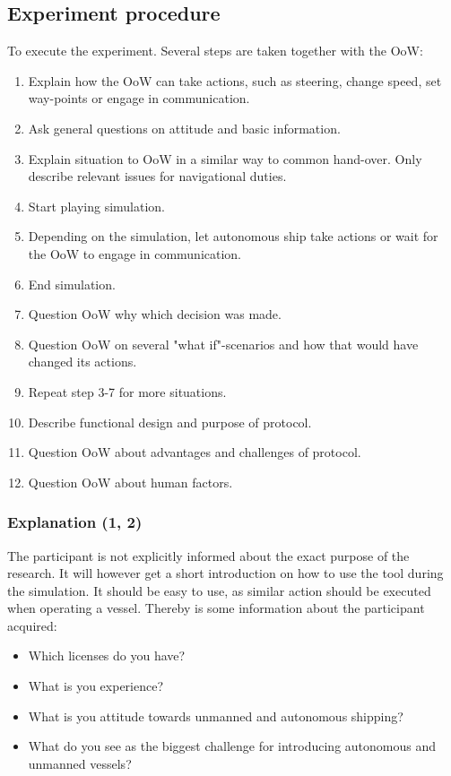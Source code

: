 \subsection{Experiment procedure}
To execute the experiment. Several steps are taken together with the \acf{OoW}:
\begin{enumerate}
	\item Explain how the OoW can take actions, such as steering, change speed, set way-points or engage in communication.
	\item Ask general questions on attitude and basic information.
	\item Explain situation to OoW in a similar way to common hand-over. Only describe relevant issues for navigational duties.
	\item Start playing simulation.
	\item Depending on the simulation, let autonomous ship take actions or wait for the OoW to engage in communication.
	\item End simulation.
	\item Question OoW why which decision was made.
	\item Question OoW on several "what if"-scenarios and how that would have changed its actions.
	\item Repeat step 3-7 for more situations.
	\item Describe functional design and purpose of protocol.
	\item Question OoW about advantages and challenges of protocol.
	\item Question OoW about human factors.
\end{enumerate}

\subsubsection{Explanation (1, 2)}
The participant is not explicitly informed about the exact purpose of the research. It will however get a short introduction on how to use the tool during the simulation. It should be easy to use, as similar action should be executed when operating a vessel. Thereby is some information about the participant acquired:
\begin{itemize}
	\item Which licenses do you have?
	\item What is you experience?
	\item What is you attitude towards unmanned and autonomous shipping?
	\item What do you see as the biggest challenge for introducing autonomous and unmanned vessels?
\end{itemize}

